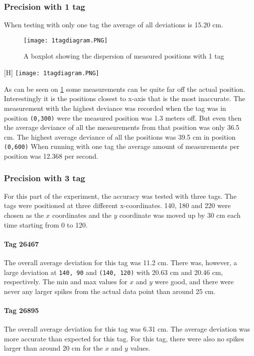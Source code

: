 \subsubsection{Precision with 1 tag} 
When testing with only one tag the average of all deviations is 15.20 cm.
\begin{figure}[H]
    \centering
    \texttt{[image: 1tagdiagram.PNG]}
    \caption{A boxplot showing the dispersion of measured positions with 1 tag}
    \label{fig:1tagdiagram}
\end{figure}[H]
\centering
\texttt{[image: 1tagdiagram.PNG]}
\caption{The boxplot showing the }
As can be seen on \ref{fig:1tagdiagram} some measurements can be quite far off the actual position. 
Interestingly it is the positions closest to x-axis that is the most inaccurate.
The measurement with the highest deviance was recorded when the tag was in position \texttt{(0,300)} were the measured position was 1.3 meters off.
But even then the average deviance of all the measurements from that position was only 36.5 cm.
The highest average deviance of all the positions was 39.5 cm in position \texttt{(0,600)}
When running with one tag the average amount of measurements per position was 12.368 per second.
 

\subsubsection{Precision with 3 tag}
For this part of the experiment, the accuracy was tested with three tags. 
The tags were positioned at three different x-coordinates. 
140, 180 and 220 were chosen as the $x$ coordinates and the $y$ coordinate was moved up by 30 cm each time starting from 0 to 120.

\paragraph{Tag 26467}
The overall average deviation for this tag was 11.2 cm.
There was, however, a large deviation at \texttt{140, 90} and \texttt{(140, 120)} with 20.63 cm and 20.46 cm, respectively.
The min and max values for $x$ and $y$ were good, and there were never any larger spikes from the actual data point than around 25 cm.

\paragraph{Tag 26895}
The overall average deviation for this tag was 6.31 cm.
The average deviation was more accurate than expected for this tag.
For this tag, there were also no spikes larger than around 20 cm for the $x$ and $y$ values.

